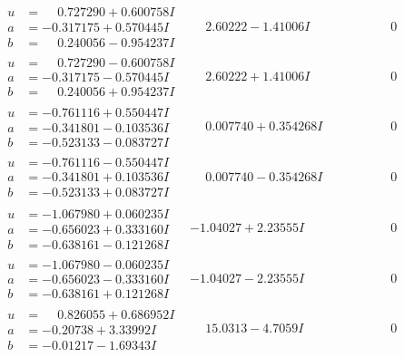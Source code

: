 \documentclass[1p]{elsarticle_modified}
\theoremstyle{definition}
\begin{document}
$$\begin{array}{c|c|c}
\begin{aligned}
u &= \phantom{-}0.727290 + 0.600758 I \\
a &= -0.317175 + 0.570445 I \\
b &= \phantom{-}0.240056 - 0.954237 I\end{aligned}
 & \phantom{-}2.60222 - 1.41006 I & \phantom{-0.000000 } 0 \\ \hline\begin{aligned}
u &= \phantom{-}0.727290 - 0.600758 I \\
a &= -0.317175 - 0.570445 I \\
b &= \phantom{-}0.240056 + 0.954237 I\end{aligned}
 & \phantom{-}2.60222 + 1.41006 I & \phantom{-0.000000 } 0 \\ \hline\begin{aligned}
u &= -0.761116 + 0.550447 I \\
a &= -0.341801 - 0.103536 I \\
b &= -0.523133 - 0.083727 I\end{aligned}
 & \phantom{-}0.007740 + 0.354268 I & \phantom{-0.000000 } 0 \\ \hline\begin{aligned}
u &= -0.761116 - 0.550447 I \\
a &= -0.341801 + 0.103536 I \\
b &= -0.523133 + 0.083727 I\end{aligned}
 & \phantom{-}0.007740 - 0.354268 I & \phantom{-0.000000 } 0 \\ \hline\begin{aligned}
u &= -1.067980 + 0.060235 I \\
a &= -0.656023 + 0.333160 I \\
b &= -0.638161 - 0.121268 I\end{aligned}
 & -1.04027 + 2.23555 I & \phantom{-0.000000 } 0 \\ \hline\begin{aligned}
u &= -1.067980 - 0.060235 I \\
a &= -0.656023 - 0.333160 I \\
b &= -0.638161 + 0.121268 I\end{aligned}
 & -1.04027 - 2.23555 I & \phantom{-0.000000 } 0 \\ \hline\begin{aligned}
u &= \phantom{-}0.826055 + 0.686952 I \\
a &= -0.20738 + 3.33992 I \\
b &= -0.01217 - 1.69343 I\end{aligned}
 & \phantom{-}15.0313 - 4.7059 I & \phantom{-0.000000 } 0 \\ \hline\begin{aligned}

\end{aligned}
\end{array}$$
\end{document}
